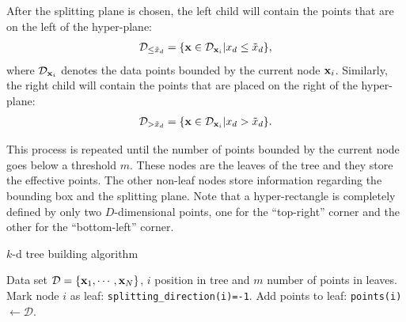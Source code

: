 After the splitting plane is chosen, the left child will contain the points that are on the left of the hyper-plane: 
\begin{align}
\mathcal{D}_{\le \tilde{x}_d} = \{ \mathbf{x} \in \mathcal{D}_{\mathbf{x}_i}| x_{d} \le \tilde{x}_d \},
\label{eq:subset-left}
\end{align}
 where $\mathcal{D}_{\mathbf{x}_i}$ denotes the data points bounded by the current node $\mathbf{x}_i$. Similarly, the right child will contain the points that are placed on the right of the hyper-plane:
\begin{align}
\mathcal{D}_{> \tilde{x}_d} = \{ \mathbf{x} \in \mathcal{D}_{\mathbf{x}_i}| x_{d} > \tilde{x}_d \}.
\label{eq:subset-right}
\end{align}

This process is repeated until the number of points bounded by the current node goes below a threshold $m$. These nodes are the leaves of the tree and they store the effective points. The other non-leaf nodes store information regarding the bounding box and the splitting plane. Note that a hyper-rectangle is completely defined by only two $D$-dimensional points, one for the ``top-right'' corner and the other for the ``bottom-left'' corner. 

	\begin{algorithm} 
		\caption{$k$-d tree building algorithm} 
		\label{alg:kd-tree-build}  
		\begin{algorithmic}                    %
			\REQUIRE Data set $\mathcal{D}=\{\mathbf{x}_1,\cdots,\mathbf{x}_N\}$, $i$ position in tree
and $m$ number of points in leaves.
				\STATE Mark node $i$ as leaf: \texttt{splitting\_direction(i)=-1}.
				\STATE Add points to leaf: \texttt{points(i)}$\leftarrow \mathcal{D}$.
				\RETURN
			\ENDIF
		\end{algorithmic}
	\end{algorithm}
	
